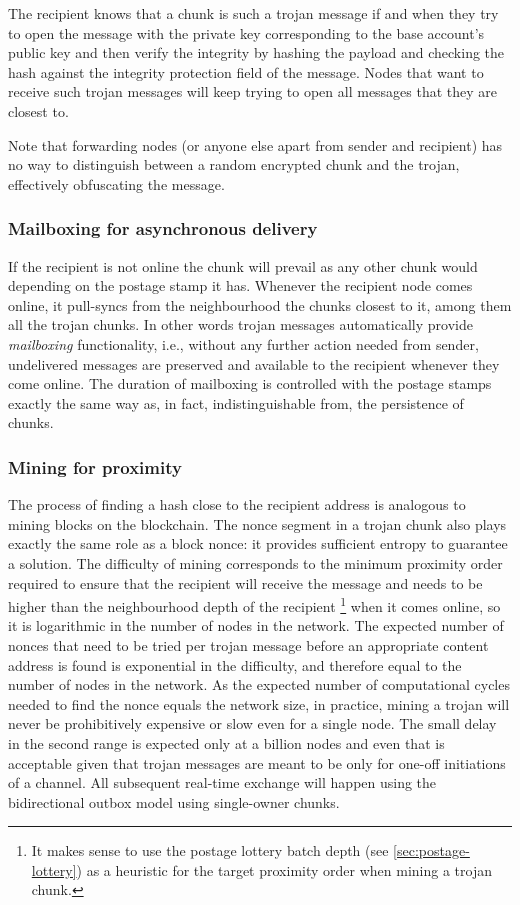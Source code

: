 The recipient knows that a chunk is such a trojan message if and when they try to open the message with the private key corresponding to the base account's public key and then verify the integrity by hashing the payload and checking the hash against the integrity protection field of the message. Nodes that want to receive such trojan messages will keep trying to open all messages that they are closest to.

Note that forwarding nodes (or anyone else apart from sender and recipient) has no way to distinguish between a random encrypted chunk and the trojan, effectively obfuscating the message.  

\subsubsection{Mailboxing for asynchronous delivery}

If the recipient is not online the chunk will prevail as any other chunk would depending on the postage stamp it has. Whenever the recipient node comes online, it pull-syncs from the neighbourhood the chunks closest to it, among them all the trojan chunks. In other words trojan messages automatically provide \emph{mailboxing} functionality, i.e., 
without any further action needed from sender, undelivered messages are preserved and available to the recipient whenever they come online. The duration of mailboxing is controlled with the postage stamps exactly the same way as, in fact, indistinguishable from, the persistence of chunks. 

\subsubsection{Mining for proximity}

The process of finding a hash close to the recipient address is analogous to mining blocks on the blockchain. The nonce segment in a trojan chunk also plays exactly the same role as a block nonce: it provides sufficient entropy to guarantee a solution. The difficulty of mining corresponds to the minimum proximity order required to ensure that the recipient will receive the message and needs to be higher than the neighbourhood depth of the recipient%
%
\footnote{It makes sense to use the postage lottery batch depth (see \ref{sec:postage-lottery}) as a heuristic for the target proximity order when mining a trojan chunk.}
%
when it comes online, so it is logarithmic in the number of nodes in the network. The expected number of nonces that need to be tried per trojan message before an appropriate content address is found is exponential in the difficulty, and therefore equal to the number of nodes in the network. As the expected number of computational cycles needed to find the nonce equals the network size, in practice, mining a trojan will never be prohibitively expensive or slow even for a single node. The small delay in the second range is expected only at a billion nodes and even that is acceptable given that trojan messages are meant to be only for one-off initiations of a channel. All subsequent real-time exchange will happen using the bidirectional outbox model using single-owner chunks.



